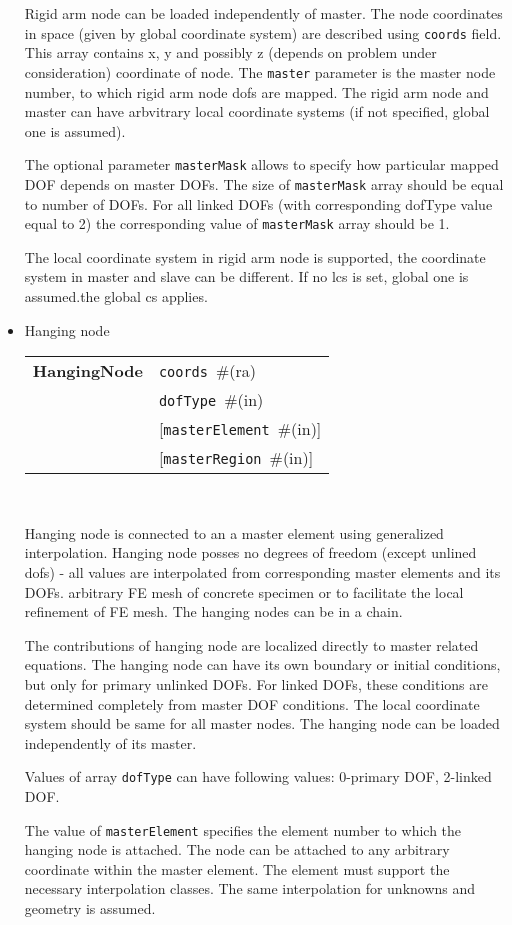 \documentclass[a4paper]{report}
\newcommand{\param}[1]{\texttt{#1}} %
\newcommand{\optional}[1]{[#1]} %
\newcommand{\field}[2]{\param{#1}~\#{\tiny(#2)}} %
\newcommand{\optField}[2]{\optional{\field{#1}{#2}}}
\newcommand{\entKeywordInst}[1]{\textbf{#1}} %
\newenvironment{record}[1][]{\begin{tabular}{|ll}}{\end{tabular}\\}
\newcommand{\recentry}[2]{{#1}&{#2}\\}
\newcounter{rcc}
\newenvironment{record}[1][\textwidth]{\setcounter{rcc}{0}\rowcolors{1}{lightgray}{lightgray}\tabularx{#1}{llR} \hline}
               {\endtabularx}
\newcommand{\recentry}[2]{\ifthenelse{\value{rcc}>0}{$\backslash$ \\}{\setcounter{rcc}{1}}{#1}&{#2}&}
\begin{document}
\begin{itemize}
Rigid arm node can be loaded
independently of master. The node coordinates in space (given by
global coordinate system) are described using \param{coords}
field. This array contains x, y and possibly z (depends on problem
under consideration) coordinate of node. The \param{master} parameter is the
master node number, to which rigid arm node dofs are mapped.
The rigid arm node and master can have arbvitrary local coordinate systems (if not specified, global one is assumed).

The optional parameter \param{masterMask} allows to specify how
particular mapped DOF depends on master DOFs. The size of \param{masterMask} array
should be equal to number of DOFs. For all linked DOFs (with
corresponding dofType value equal to 2) the corresponding value of
\param{masterMask} array should be 1.

The local coordinate system in rigid arm node  is supported, 
the coordinate system in master and slave can be different. 
If no lcs is set, global one is assumed.the global cs applies.

\item Hanging node

\begin{record}[0.9\textwidth]
  \recentry{\entKeywordInst{HangingNode}}{\field{coords}{ra}}
  \recentry{}{\field{dofType}{in}}
  \recentry{}{\optField{masterElement}{in}}
  \recentry{}{\optField{masterRegion}{in}}
\end{record}

Hanging node is connected to an a master element using generalized interpolation.
Hanging node posses no degrees of freedom (except unlined dofs) - all values are
interpolated from corresponding master elements and its DOFs.
arbitrary FE mesh of concrete specimen or to facilitate the local
refinement of FE mesh. The hanging nodes can be in a chain.

The contributions of hanging node are localized directly to master related equations.
The hanging node can have its own boundary or initial conditions, but
only for primary unlinked DOFs. For linked DOFs, these conditions are
determined completely from master DOF conditions.
The local coordinate system should be same for all master nodes.
The hanging node can be loaded independently of its master.

Values of array \param{dofType} can have following values:
0-primary DOF, 2-linked DOF.

The value of \param{masterElement} specifies the element number to which the hanging node is attached.
The node can be attached to any arbitrary coordinate within the master element.
The element must support the necessary interpolation classes.
The same interpolation for unknowns and geometry is assumed.


\end{itemize}
\end{document}
